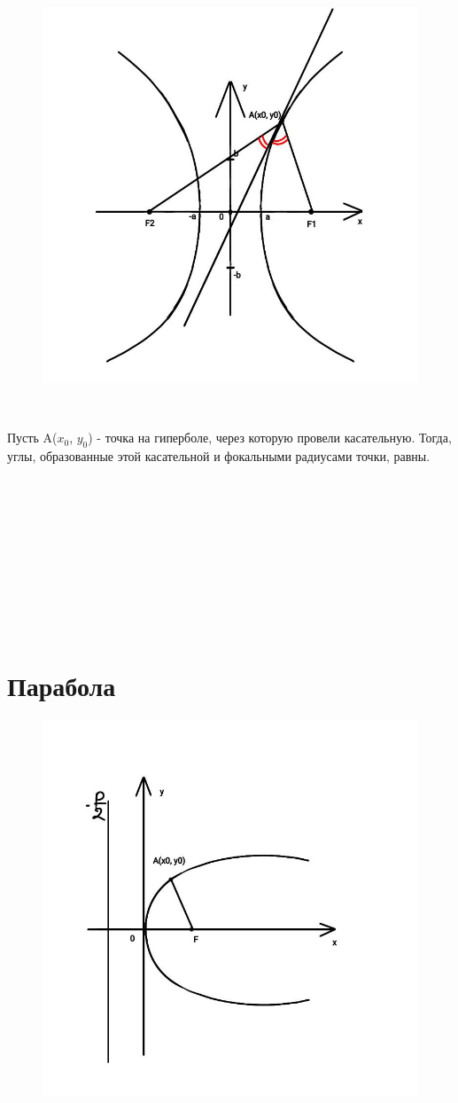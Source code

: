 \begin{figure}
    \includegraphics[width=.8\linewidth]{images/гипербола3.jpeg}
\end{figure}
\tab\\ 
\begin{theorem}
    Пусть A($x_0$, $y_0$) - точка на гиперболе, через которую провели касательную. Тогда, углы, образованные этой касательной и фокальными радиусами точки, равны.
\end{theorem}
\tab\\ \tab\\ \tab\\ \tab\\ \tab\\ \tab\\ \tab\\ \tab\\ \tab\\ 
\section{Парабола}

\begin{figure}
    \includegraphics[width=.8\linewidth]{images/парабола1.jpeg}
\end{figure}


